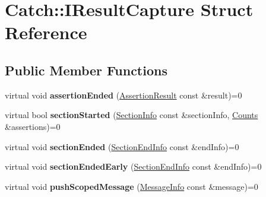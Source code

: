 \hypertarget{struct_catch_1_1_i_result_capture}{}\section{Catch\+:\+:I\+Result\+Capture Struct Reference}
\label{struct_catch_1_1_i_result_capture}
\subsection*{Public Member Functions}
\begin{DoxyCompactItemize}
\item 
\mbox{\label{struct_catch_1_1_i_result_capture_ae45e08bccc5fb434656d4f2e44742223}} 
virtual void {\bfseries assertion\+Ended} (\hyperlink{class_catch_1_1_assertion_result}{Assertion\+Result} const \&result)=0
\item 
\mbox{\label{struct_catch_1_1_i_result_capture_a5b76ed52badcb64cf374202e12b81a03}} 
virtual bool {\bfseries section\+Started} (\hyperlink{struct_catch_1_1_section_info}{Section\+Info} const \&section\+Info, \hyperlink{struct_catch_1_1_counts}{Counts} \&assertions)=0
\item 
\mbox{\label{struct_catch_1_1_i_result_capture_a4e152bc43dc0933684e31fa67a58195d}} 
virtual void {\bfseries section\+Ended} (\hyperlink{struct_catch_1_1_section_end_info}{Section\+End\+Info} const \&end\+Info)=0
\item 
\mbox{\label{struct_catch_1_1_i_result_capture_afcc71eef8ca821ae132cced4a2be6988}} 
virtual void {\bfseries section\+Ended\+Early} (\hyperlink{struct_catch_1_1_section_end_info}{Section\+End\+Info} const \&end\+Info)=0
\item 
\mbox{\label{struct_catch_1_1_i_result_capture_a91d154c1e087e383dcde5aad95cb6a05}} 
virtual void {\bfseries push\+Scoped\+Message} (\hyperlink{struct_catch_1_1_message_info}{Message\+Info} const \&message)=0
\item 
\mbox{\label{struct_catch_1_1_i_result_capture_a42bcb13276706bf8c3ce081ce16d37fd}} 

\end{DoxyCompactItemize}
